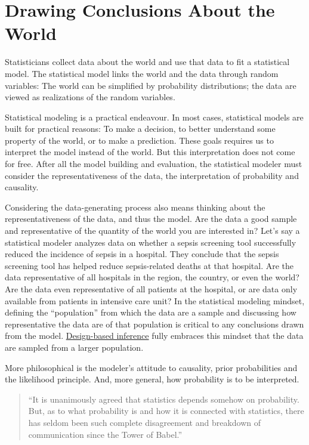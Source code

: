\documentclass[
  10pt,
]{scrbook}
\begin{document}
\hypertarget{drawing-conclusions-about-the-world}{%
\section{Drawing Conclusions About the World}\label{drawing-conclusions-about-the-world}}

Statisticians collect data about the world and use that data to fit a statistical model.
The statistical model links the world and the data through random variables:
The world can be simplified by probability distributions;
the data are viewed as realizations of the random variables.

Statistical modeling is a practical endeavour.
In most cases, statistical models are built for practical reasons:
To make a decision, to better understand some property of the world, or to make a prediction.
These goals requires us to interpret the model instead of the world.
But this interpretation does not come for free.
After all the model building and evaluation, the statistical modeler must consider the representativeness of the data, the interpretation of probability and causality.

Considering the data-generating process also means thinking about the representativeness of the data, and thus the model.
Are the data a good sample and representative of the quantity of the world you are interested in?
Let's say a statistical modeler analyzes data on whether a sepsis screening tool successfully reduced the incidence of sepsis in a hospital.
They conclude that the sepsis screening tool has helped reduce sepsis-related deaths at that hospital.
Are the data representative of all hospitals in the region, the country, or even the world?
Are the data even representative of all patients at the hospital, or are data only available from patients in intensive care unit?
In the statistical modeling mindset, defining the ``population'' from which the data are a sample and discussing how representative the data are of that population is critical to any conclusions drawn from the model.
\protect\hyperlink{design-based}{Design-based inference} fully embraces this mindset that the data are sampled from a larger population.

More philosophical is the modeler's attitude to causality, prior probabilities and the likelihood principle.
And, more general, how probability is to be interpreted.

\begin{quote}
``It is unanimously agreed that statistics depends somehow on probability. But, as to what probability is and how it is connected with statistics, there has seldom been such complete disagreement and breakdown of communication since the Tower of Babel.''
\end{quote}
\end{document}
